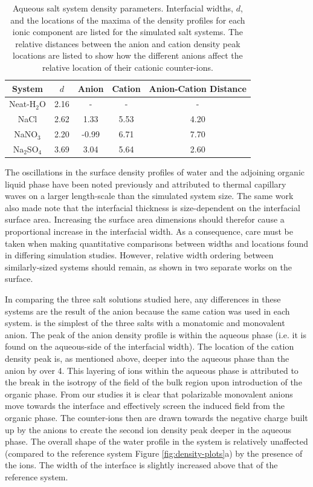 \begin{table}[htdp]
	\begin{center}
	\begin{tabular}{|c||c|c|c|c|}
		\hline
		System & $d$ & Anion & Cation & Anion-Cation Distance \\ \hline
		Neat-H$_2$O & 2.16 & - & - & - \\ 
		NaCl & 2.62 & 1.33 & 5.53 & 4.20 \\
		NaNO$_3$ & 2.20 & -0.99 & 6.71 & 7.70 \\
		Na$_2$SO$_4$ & 3.69 & 3.04 & 5.64 & 2.60 \\
		\hline
	\end{tabular}
	\end{center}
	\caption{Aqueous salt system density parameters. Interfacial widths, $d$, and the locations of the maxima of the density profiles for each ionic component are listed for the simulated salt systems. The relative distances between the anion and cation density peak locations are listed to show how the different anions affect the relative location of their cationic counter-ions.}
	\label{table:double-layer}
\end{table}

The oscillations in the surface density profiles of water and the adjoining organic \ctc liquid phase have been noted previously and attributed to thermal capillary waves on a larger length-scale than the simulated system size.\cite{Chang1996} The same work also made note that the interfacial thickness is size-dependent on the interfacial surface area. Increasing the surface area dimensions should therefor cause a proportional increase in the interfacial width. As a consequence, care must be taken when making quantitative comparisons between widths and locations found in differing simulation studies. However, relative width ordering between similarly-sized systems should remain, as shown in two separate works on the \ctcwat surface.\cite{Chang1996,Hore2008}

In comparing the three salt solutions studied here, any differences in these systems are the result of the anion because the same cation was used in each system. \nacl is the simplest of the three salts with a monatomic and monovalent anion. The peak of the anion density profile is within the aqueous phase (i.e. it is found on the aqueous-side of the interfacial width). The location of the cation density peak is, as mentioned above, deeper into the aqueous phase than the anion by over 4\angs. This layering of ions within the aqueous phase is attributed to the break in the isotropy of the field of the bulk region upon introduction of the organic phase. From our studies it is clear that polarizable monovalent anions move towards the interface and effectively screen the induced field from the organic phase. The counter-ions then are drawn towards the negative charge built up by the anions to create the second ion density peak deeper in the aqueous phase. The overall shape of the water profile in the \nacl system is relatively unaffected (compared to the reference \ctcwat system Figure \ref{fig:density-plots}a) by the presence of the ions. The width of the interface is slightly increased above that of the reference system.

